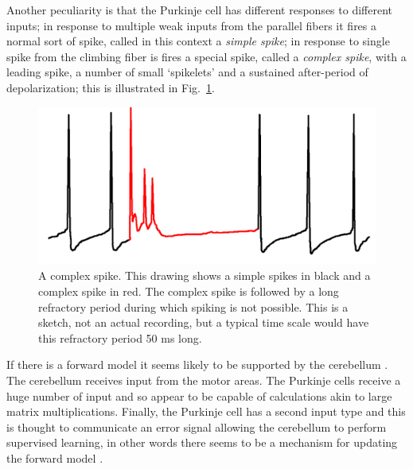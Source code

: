 \documentclass[12pt]{article}
\begin{document}
Another peculiarity is that the Purkinje cell has different responses
to different inputs; in response to multiple weak inputs from the
parallel fibers it fires a normal sort of spike, called in this
context a \textsl{simple spike}; in response to single spike from the
climbing fiber is fires a special spike, called a \textsl{complex
  spike}, with a leading spike, a number of small \lq{}spikelets\rq{}
and a sustained after-period of depolarization; this is illustrated in
Fig.~\ref{fig:spikes}.

\begin{figure}
\begin{center}
\includegraphics[width=8.cm]{complex_spike.png}
\end{center}
\caption{A complex spike. This drawing shows a simple spikes in black
  and a complex spike in red. The complex spike is followed by a long
  refractory period during which spiking is not possible. This is a
  sketch, not an actual recording, but a typical time scale would have
  this refractory period 50 ms long.\label{fig:spikes}}
\end{figure}

If there is a forward model it seems likely to be supported by the
cerebellum \cite{GaoEtAl1996}. The cerebellum receives input from the motor areas. The
Purkinje cells receive a huge number of input and so appear to be
capable of calculations akin to large matrix multiplications. Finally,
the Purkinje cell has a second input type and this is thought to
communicate an error signal allowing the cerebellum to perform
supervised learning, in other words there seems to be a mechanism for
updating the forward model \cite{Marr1969,Albus1971}.



 {}
\end{document}
